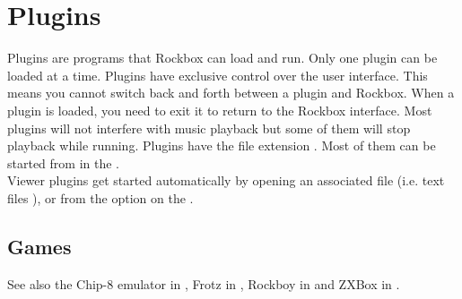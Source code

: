 \chapter{Plugins}\label{ref:plugins}
Plugins are programs that Rockbox can load and run. Only one plugin can
be loaded at a time. Plugins have exclusive control over the user interface.
This means you cannot switch back and forth between a plugin and Rockbox. When
a plugin is loaded, you need to exit it to return to the Rockbox interface.
Most plugins will not interfere with music playback but some of them will stop
playback while running. Plugins have the file extension . Most of
them can be started from  in the .\\

Viewer plugins get started automatically by opening an associated file (i.e.
text files%
%
), or from the  option on the .

\section{Games}
    {See also the Chip{}-8 emulator in ,
    Frotz in ,
    {Rockboy in }
    and ZXBox in .}










{}

